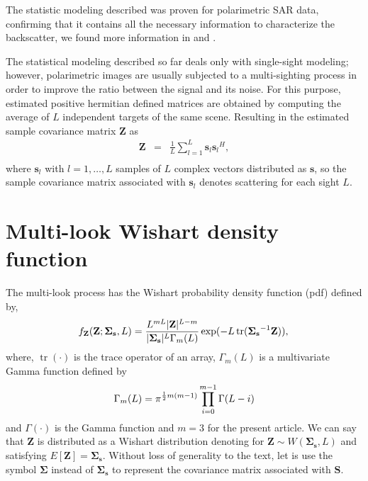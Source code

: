 \documentclass[conference]{IEEEtran}
\DeclareMathOperator{\traco}{tr}
\begin{document}
{{{{The statistic modeling described was proven for polarimetric SAR data, confirming that it contains all the necessary information to characterize the backscatter, we found more information in \cite{sarabendi} and \cite{mfp}.
 
The statistical modeling described so far deals only with single-sight modeling; however, polarimetric images are usually subjected to a multi-sighting process in order to improve the ratio between the signal and its noise. For this purpose, estimated positive hermitian defined matrices are obtained by computing the average of $L$ independent targets of the same scene. Resulting in the estimated sample covariance matrix {\bf Z} as \cite{good, ade}
\begin{equation}\label{eq_04}
\begin{array}{ccc}
    \mathbf{Z}&=&\frac{1}{L}\displaystyle{\sum_{l=1}^{L} {\mathbf{s}_l}{\mathbf{s}_l}^H}, \\
\end{array}
\end{equation}
where $\mathbf{s}_l$ with $l = 1, \dots, L$ samples of $\mathit{L}$ complex vectors distributed as $\mathbf{s}$, so the sample covariance matrix associated with $\mathbf{s}_l$ denotes scattering for each sight $L$.

\section{Multi-look Wishart density function}\label{sec_03}
The multi-look process has the Wishart probability density function (pdf) defined by,
\begin{equation}\label{eq_05}
    f_{\mathbf{Z}}(\mathbf{Z};\mathbf{\Sigma_{s}},L)=\frac{L^{mL}|\mathbf{Z}|^{L-m}}{|\mathbf{\Sigma_{s}}|^{L}\Gamma_m(L)} \exp(-L\traco(\mathbf{\Sigma_{s}}^{-1}\mathbf{Z})), \\
\end{equation} 
where, $\traco(\cdot)$ is the trace operator of an array, $\Gamma_m(L)$ is a multivariate Gamma function defined by
\begin{equation*}
	\Gamma_m(L)=\pi^{\frac{1}{2}m(m-1)} \prod_{i=0}^{m-1}\Gamma(L-i) \\
\end{equation*}
and $\Gamma(\cdot)$ is the Gamma function and $m=3$ for the present article. We can say that $\mathbf{Z}$ is distributed as a Wishart distribution denoting for $\mathbf{Z}\sim W(\mathbf{\Sigma_{s}}, L)$ and satisfying $E[\mathbf{Z}]=\mathbf{\Sigma_{s}}$. Without loss of generality to the text, let is use the symbol $\mathbf{\Sigma}$ instead of $\mathbf{\Sigma_{s}}$ to represent the covariance matrix associated with $\mathbf{S}$.

}}}}
\end{document}
